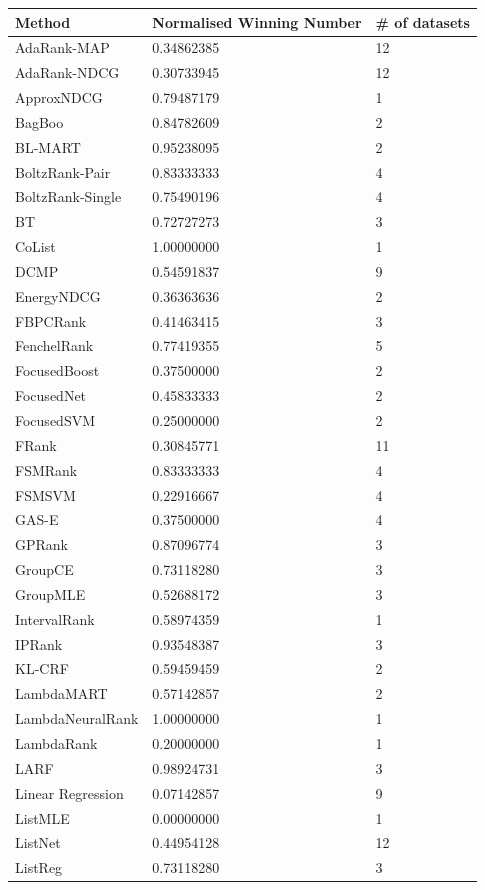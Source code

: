 \documentclass{sig-alternate-2013}
\begin{document}
\begin{table}
\begin{tabular}{l|l|l}
Method & Normalised Winning Number & \# of datasets \\
\hline
AdaRank-MAP & 0.34862385 & 12 \\ 
AdaRank-NDCG & 0.30733945 & 12 \\ 
ApproxNDCG & 0.79487179 & 1 \\ 
BagBoo & 0.84782609 & 2 \\ 
BL-MART & 0.95238095 & 2 \\ 
BoltzRank-Pair & 0.83333333 & 4 \\ 
BoltzRank-Single & 0.75490196 & 4 \\ 
BT & 0.72727273 & 3 \\ 
CoList & 1.00000000 & 1 \\ 
DCMP & 0.54591837 & 9 \\ 
EnergyNDCG & 0.36363636 & 2 \\ 
FBPCRank & 0.41463415 & 3 \\ 
FenchelRank & 0.77419355 & 5 \\ 
FocusedBoost & 0.37500000 & 2 \\ 
FocusedNet & 0.45833333 & 2 \\ 
FocusedSVM & 0.25000000 & 2 \\ 
FRank & 0.30845771 & 11 \\ 
FSMRank & 0.83333333 & 4 \\ 
FSMSVM & 0.22916667 & 4 \\ 
GAS-E & 0.37500000 & 4 \\ 
GPRank & 0.87096774 & 3 \\ 
GroupCE & 0.73118280 & 3 \\ 
GroupMLE & 0.52688172 & 3 \\ 
IntervalRank & 0.58974359 & 1 \\ 
IPRank & 0.93548387 & 3 \\ 
KL-CRF & 0.59459459 & 2 \\ 
LambdaMART & 0.57142857 & 2 \\ 
LambdaNeuralRank & 1.00000000 & 1 \\ 
LambdaRank & 0.20000000 & 1 \\ 
LARF & 0.98924731 & 3 \\ 
Linear Regression & 0.07142857 & 9 \\ 
ListMLE & 0.00000000 & 1 \\ 
ListNet & 0.44954128 & 12 \\ 
ListReg & 0.73118280 & 3 \\ 

\end{tabular}
\end{table}
\end{document}
